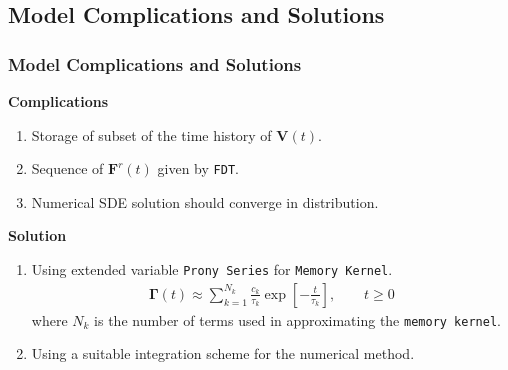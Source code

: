 \documentclass[a4paper,10pt]{beamer}
\newcommand{\BS}[1]{\boldsymbol{#1}}
\newcommand{\sqb}[1]{\left[ #1 \right]}
\begin{document}
	\begin{frame}
		\subsection{Model Complications and Solutions}
		\frametitle{Model Complications and Solutions}
		\vspace{-0.8cm}
		\begin{minipage}[t]{0.44\textwidth}
			\begin{alertblock}{\textbf{Complications}}
				\begin{enumerate}
					\item {Storage of subset of the time history of $\BS{V}(t)$.}
					\item {Sequence of $\BS{F}^{r}(t)$ given by \texttt{FDT}.}
					\item {Numerical SDE solution should converge in distribution.}
				\end{enumerate}
			\end{alertblock}
		\end{minipage}
		\hfill
		\begin{minipage}[t]{0.52\textwidth}
			\centering
			\begin{exampleblock}{\textbf{Solution}}
				\begin{enumerate}
					\item {Using extended variable \texttt{Prony Series} for \texttt{Memory Kernel}.
					\scriptsize
					\begin{align}
					 \BS{\Gamma}(t) \approx \sum_{k=1}^{N_{k}} \frac{c_{k}}{\tau_{k}} \exp \sqb{-\frac{t}{\tau_{k}}}, \qquad t \geq 0 \end{align}
					\normalsize
					where $N_{k}$ is the number of terms used in approximating the \texttt{memory kernel}. }
					\item {Using a suitable integration scheme for the numerical method.}
				\end{enumerate}
			\end{exampleblock}
		\end{minipage}
	\end{frame}
\end{document}
